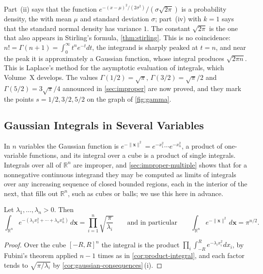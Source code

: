 Part~(ii) says that the function $e^{-(x-\mu)^2/(2\sigma^2)}/(\sigma\sqrt{2\pi})$ is a probability density, the  with mean $\mu$ and standard deviation $\sigma$; part~(iv) with $k=1$ says that the standard normal density has variance $1$. The constant $\sqrt{2\pi}$ is the one that also appears in Stirling's formula, \cref{thm:stirling}. This is no coincidence: $n!=\Gamma(n+1)=\int_0^\infty t^ne^{-t}dt$, the integrand is sharply peaked at $t=n$, and near the peak it is approximately a Gaussian function, whose integral produces $\sqrt{2\pi n}$. This is Laplace's method for the asymptotic evaluation of integrals, which Volume~X develops. The values $\Gamma(1/2)=\sqrt\pi$, $\Gamma(3/2)=\sqrt\pi/2$ and $\Gamma(5/2)=3\sqrt\pi/4$ announced in \cref{sec:improper} are now proved, and they mark the points $s=1/2,3/2,5/2$ on the graph of \cref{fig:gamma}.

\subsection{Gaussian Integrals in Several Variables}

In $n$ variables the Gaussian function is $e^{-\|\mathbf x\|^2}=e^{-x_1^2}\cdots e^{-x_n^2}$, a product of one-variable functions, and its integral over a cube is a product of single integrals. Integrals over all of $\mathbb R^n$ are improper, and \cref{sec:improper-multiple} shows that for a nonnegative continuous integrand they may be computed as limits of integrals over any increasing sequence of closed bounded regions, each in the interior of the next, that fills out $\mathbb R^n$, such as cubes or balls; we use this here in advance.

\begin{proposition}
\label{prop:gaussian-n}
Let $\lambda_1,\ldots,\lambda_n>0$. Then
\[
\int_{\mathbb R^n}e^{-(\lambda_1x_1^2+\cdots+\lambda_nx_n^2)}\,d\mathbf x=\prod_{i=1}^n\sqrt{\frac\pi{\lambda_i}}\qquad\text{and in particular}\qquad\int_{\mathbb R^n}e^{-\|\mathbf x\|^2}\,d\mathbf x=\pi^{n/2}.
\]
\end{proposition}

\begin{proof}
Over the cube $[-R,R]^n$ the integral is the product $\prod_i\int_{-R}^Re^{-\lambda_ix_i^2}dx_i$, by Fubini's theorem applied $n-1$ times as in \cref{cor:product-integral}, and each factor tends to $\sqrt{\pi/\lambda_i}$ by \cref{cor:gaussian-consequences}\,(i).
\end{proof}

